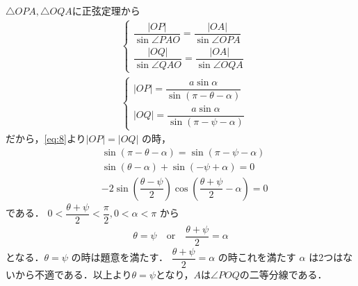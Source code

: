 \documentclass[../../main.tex]{subfiles}
\begin{document}
$\triangle OPA, \triangle OQA$に正弦定理から
\begin{align}
  &
  \begin{cases}
    \dfrac{|OP|}{\sin\angle PAO} = \dfrac{|OA|}{\sin\angle OPA} \\
    \dfrac{|OQ|}{\sin\angle QAO} = \dfrac{|OA|}{\sin\angle OQA}
  \end{cases}\\
  &
  \begin{cases}
    |OP| = \dfrac{a \sin\alpha}{\sin(\pi - \theta - \alpha)} \\
    |OQ| = \dfrac{a \sin\alpha}{\sin(\pi - \psi - \alpha)}
  \end{cases}
\end{align}
だから，\cref{eq:8}より$|OP| = |OQ|$ の時，
\begin{align}
  & \sin(\pi - \theta - \alpha) = \sin(\pi - \psi - \alpha) \\
  & \sin(\theta - \alpha) + \sin(-\psi + \alpha) = 0 \\
  & -2 \sin\left(\dfrac{\theta - \psi}{2}\right) \cos\left(\dfrac{\theta + \psi}{2} - \alpha\right) = 0
\end{align}
である．
$0 < \dfrac{\theta + \psi}{2} < \dfrac{\pi}{2}, 0 < \alpha < \pi$ から
\begin{align}
  \theta = \psi \quad \text{or} \quad \dfrac{\theta + \psi}{2} = \alpha
\end{align}
となる．$\theta = \psi$ の時は題意を満たす．
$\dfrac{\theta + \psi}{2} = \alpha$ の時これを満たす $\alpha$ は2つはないから不適である．以上より$\theta = \psi$となり，$A$は$\angle POQ$の二等分線である．

\newpage
\end{document}
